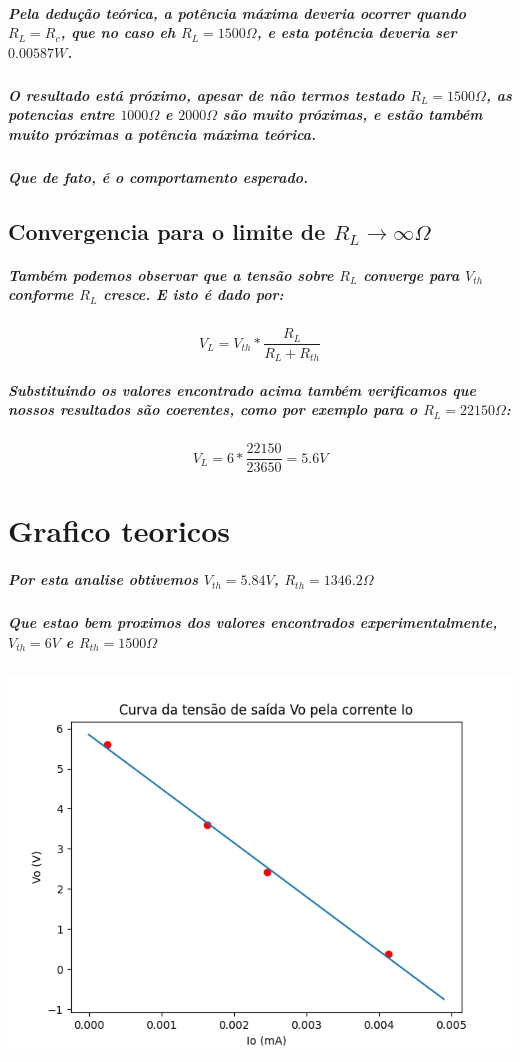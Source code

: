 \documentclass[12pt,twoside, a4paper, twocolumn]{article}
\begin{document}
\subparagraph*{Pela dedução teórica, a potência máxima deveria ocorrer quando $R_L = R_{c}$, que no caso eh $R_{L} = 1500 \varOmega$, e esta potência deveria ser $0.00587W$.}

\subparagraph*{O resultado está próximo, apesar de não termos testado $R_{L} = 1500\varOmega$, as potencias entre $1000\varOmega$ e $2000\varOmega$ são muito próximas, e estão também muito próximas a potência máxima teórica. }

\subparagraph*{Que de fato, é o comportamento esperado.}

\subsection{Convergencia para o limite de $R_L \rightarrow \infty\varOmega$}

\subparagraph*{Também podemos observar que a tensão sobre $R_L$ converge para $V_{th}$ conforme $R_L$ cresce. E isto é dado por:}

\begin{equation}
    V_{L} = V_{th} * \frac{R_{L}}{R_{L} + R_{th}}
\end{equation}

\subparagraph*{Substituindo os valores encontrado acima também verificamos que nossos resultados são coerentes, como por exemplo para o $R_L = 22150\varOmega$:}

\begin{equation}
    V_{L} = 6 * \frac{22150}{23650} = 5.6V
\end{equation}

\section{Grafico teoricos}

\subparagraph*{Por esta analise obtivemos $V_{th} = 5.84V$, $R_{th} = 1346.2\varOmega$}
\subparagraph*{Que estao bem proximos dos valores encontrados experimentalmente, $V_{th} = 6V$ e $R_{th} = 1500\varOmega$}
\paragraph*{}
\begin{adjustbox}{scale=0.60}
    \includegraphics{Figure_1.png}
\end{adjustbox}
\end{document}

